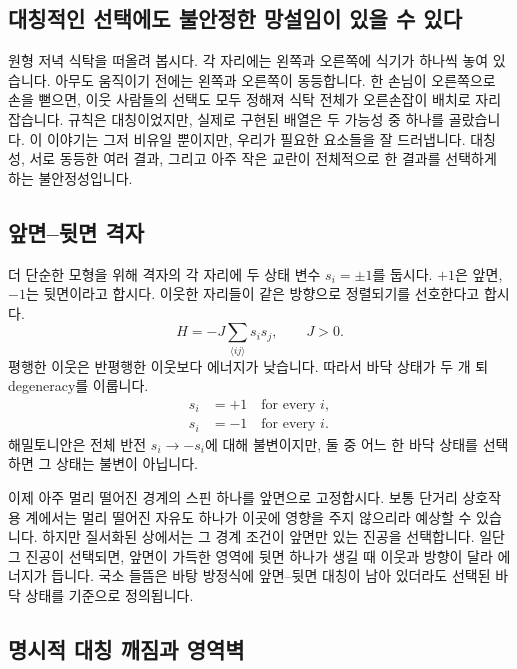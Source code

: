 \subsection{대칭적인 선택에도 불안정한 망설임이 있을 수 있다}

원형 저녁 식탁을 떠올려 봅시다. 각 자리에는 왼쪽과 오른쪽에 식기가 하나씩 놓여 있습니다. 아무도 움직이기 전에는 왼쪽과 오른쪽이 동등합니다. 한 손님이 오른쪽으로 손을 뻗으면, 이웃 사람들의 선택도 모두 정해져 식탁 전체가 오른손잡이 배치로 자리 잡습니다. 규칙은 대칭이었지만, 실제로 구현된 배열은 두 가능성 중 하나를 골랐습니다. 이 이야기는 그저 비유일 뿐이지만, 우리가 필요한 요소들을 잘 드러냅니다. 대칭성, 서로 동등한 여러 결과, 그리고 아주 작은 교란이 전체적으로 한 결과를 선택하게 하는 불안정성입니다.

\subsection{앞면--뒷면 격자}

더 단순한 모형을 위해 격자의 각 자리에 두 상태 변수 \(s_i=\pm1\)를 둡시다. \(+1\)은 앞면, \(-1\)는 뒷면이라고 합시다. 이웃한 자리들이 같은 방향으로 정렬되기를 선호한다고 합시다.
\begin{equation}
  H=-J\sum_{\langle ij\rangle}s_i s_j,
  \qquad J>0.
\end{equation}
평행한 이웃은 반평행한 이웃보다 에너지가 낮습니다. 따라서 바닥 상태가 두 개 퇴 degeneracy를 이룹니다.
\begin{equation}
\begin{aligned}
  s_i&=+1\quad\text{for every }i,
  \\
  s_i&=-1\quad\text{for every }i.
\end{aligned}
\end{equation}
해밀토니안은 전체 반전 \(s_i\to-s_i\)에 대해 불변이지만, 둘 중 어느 한 바닥 상태를 선택하면 그 상태는 불변이 아닙니다.

이제 아주 멀리 떨어진 경계의 스핀 하나를 앞면으로 고정합시다. 보통 단거리 상호작용 계에서는 멀리 떨어진 자유도 하나가 이곳에 영향을 주지 않으리라 예상할 수 있습니다. 하지만 질서화된 상에서는 그 경계 조건이 앞면만 있는 진공을 선택합니다. 일단 그 진공이 선택되면, 앞면이 가득한 영역에 뒷면 하나가 생길 때 이웃과 방향이 달라 에너지가 듭니다. 국소 들뜸은 바탕 방정식에 앞면--뒷면 대칭이 남아 있더라도 선택된 바닥 상태를 기준으로 정의됩니다.

\subsection{명시적 대칭 깨짐과 영역벽}

